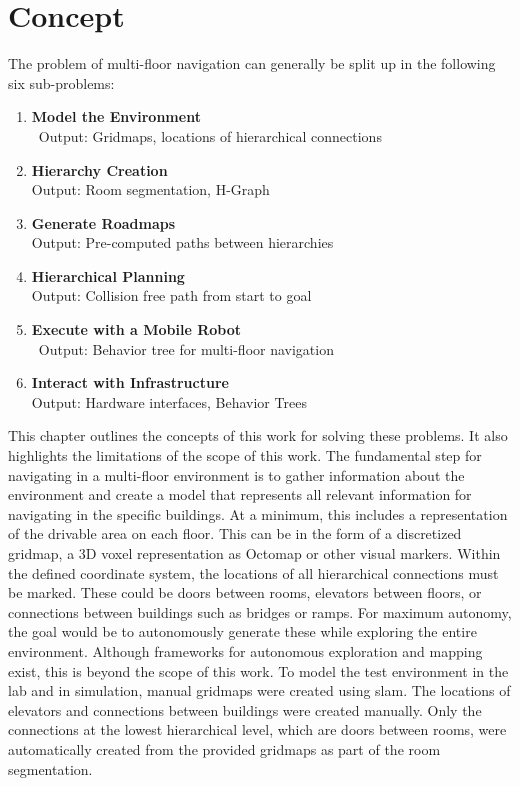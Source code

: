 \chapter{Concept}
\label{sec:concept}
The problem of multi-floor navigation can generally be split up in the following six sub-problems:

\begin{enumerate}
    \item \textbf{Model the Environment}\\\
    Output: Gridmaps, locations of hierarchical connections
    \item \textbf{Hierarchy Creation}\\
    Output: Room segmentation, H-Graph
    \item \textbf{Generate Roadmaps}\\
    Output: Pre-computed paths between hierarchies
    \item \textbf{Hierarchical Planning}\\
    Output: Collision free path from start to goal
    \item \textbf{Execute with a Mobile Robot}\\\
    Output: Behavior tree for multi-floor navigation
    \item \textbf{Interact with Infrastructure}\\
    Output: Hardware interfaces, Behavior Trees
\end{enumerate}

This chapter outlines the concepts of this work for solving these problems. It also highlights the limitations of the scope of this work. The fundamental step for navigating in a multi-floor environment is to gather information about the environment and create a model that represents all relevant information for navigating in the specific buildings. At a minimum, this includes a representation of the drivable area on each floor. This can be in the form of a discretized gridmap, a 3D voxel representation as Octomap \cite{hornung_octomap_2013} or other visual markers. Within the defined coordinate system, the locations of all hierarchical connections must be marked. These could be doors between rooms, elevators between floors, or connections between buildings such as bridges or ramps. For maximum autonomy, the goal would be to autonomously generate these while exploring the entire environment. Although frameworks for autonomous exploration and mapping exist, this is beyond the scope of this work. To model the test environment in the lab and in simulation, manual gridmaps were created using \gls{slam}. The locations of elevators and connections between buildings were created manually. Only the connections at the lowest hierarchical level, which are doors between rooms, were automatically created from the provided gridmaps as part of the room segmentation.

